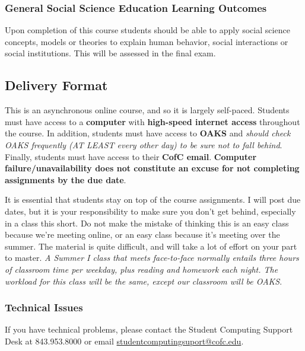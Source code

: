 \hypertarget{general-social-science-education-learning-outcomes}{%
\subsubsection{General Social Science Education Learning
Outcomes}\label{general-social-science-education-learning-outcomes}}

Upon completion of this course students should be able to apply social
science concepts, models or theories to explain human behavior, social
interactions or social institutions. This will be assessed in the final
exam.

\hypertarget{delivery-format}{%
\subsection{Delivery Format}\label{delivery-format}}

This is an asynchronous online course, and so it is largely self-paced.
Students must have access to a \textbf{computer} with \textbf{high-speed
internet access} throughout the course. In addition, students must have
access to \textbf{OAKS} and \emph{should check OAKS frequently (AT LEAST
every other day) to be sure not to fall behind}. Finally, students must
have access to their \textbf{CofC email}. \textbf{Computer
failure/unavailability does not constitute an excuse for not completing
assignments by the due date}.

\vspace{0.1in}

\noindent It is essential that students stay on top of the course
assignments. I will post due dates, but it is your responsibility to
make sure you don't get behind, especially in a class this short. Do not
make the mistake of thinking this is an easy class because we're meeting
online, or an easy class because it's meeting over the summer. The
material is quite difficult, and will take a lot of effort on your part
to master. \emph{A Summer I class that meets face-to-face normally
entails three hours of classroom time per weekday, plus reading and
homework each night. The workload for this class will be the same,
except our classroom will be OAKS}.

\hypertarget{technical-issues}{%
\subsubsection{Technical Issues}\label{technical-issues}}

If you have technical problems, please contact the Student Computing
Support Desk at 843.953.8000 or email
\url{studentcomputingsuport@cofc.edu}.


